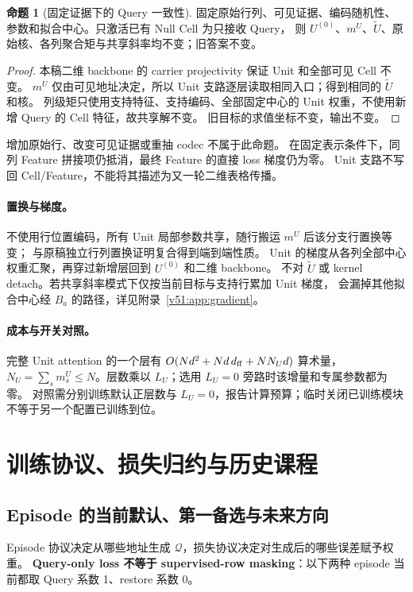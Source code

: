 \documentclass[11pt,UTF8,fontset=fandol]{ctexart}
\numberwithin{equation}{section}
\theoremstyle{definition}
\newtheorem{proposition}[definition]{命题}
\newcommand{\Qset}{\mathcal Q}
\begin{document}
\begin{proposition}[固定证据下的 Query 一致性]
固定原始行列、可见证据、编码随机性、参数和拟合中心。只激活已有 Null Cell 为只接收 Query，
则 $U^{(0)}$、$m^U$、$\widetilde U$、原始核、各列聚合矩与共享斜率均不变；旧答案不变。
\end{proposition}
\begin{proof}
本稿二维 backbone 的 carrier projectivity 保证 Unit 和全部可见 Cell 不变。
$m^U$ 仅由可见地址决定，所以 Unit 支路逐层读取相同入口；得到相同的 $\widetilde U$ 和核。
列级矩只使用支持特征、支持编码、全部固定中心的 Unit 权重，不使用新增 Query 的 Cell 特征，故共享解不变。
旧目标的求值坐标不变，输出不变。
\end{proof}
增加原始行、改变可见证据或重抽 codec 不属于此命题。
在固定表示条件下，同列 Feature 拼接项仍抵消，最终 Feature 的直接 loss 梯度仍为零。
Unit 支路不写回 Cell/Feature，不能将其描述为又一轮二维表格传播。

\paragraph{置换与梯度。}
不使用行位置编码，所有 Unit 局部参数共享，随行搬运 $m^U$ 后该分支行置换等变；
与原稿独立行列置换证明复合得到端到端性质。
Unit 的梯度从各列全部中心权重汇聚，再穿过新增层回到 $U^{(0)}$ 和二维 backbone。
不对 $\widetilde U$ 或 kernel detach。若共享斜率模式下仅按当前目标与支持行累加 Unit 梯度，
会漏掉其他拟合中心经 $B_a$ 的路径，详见附录~\ref{v51:app:gradient}。

\paragraph{成本与开关对照。}
完整 Unit attention 的一个层有 $O(Nd^2+Nd\,d_{\rm ff}+NN_Ud)$ 算术量，
$N_U=\sum_s m_s^U\le N$。层数乘以 $L_U$；选用 $L_U=0$ 旁路时该增量和专属参数都为零。
对照需分别训练默认正层数与 $L_U=0$，报告计算预算；临时关闭已训练模块不等于另一个配置已训练到位。



\section{训练协议、损失归约与历史课程}
\label{sec:T:training}

\subsection{Episode 的当前默认、第一备选与未来方向}
\label{v54:sec:episode-choice}
Episode 协议决定从哪些地址生成 $\Qset$，损失协议决定对生成后的哪些误差赋予权重。
\textbf{Query-only loss 不等于 supervised-row masking}：以下两种 episode 当前都取 Query 系数 1、restore 系数 0。
\end{document}
